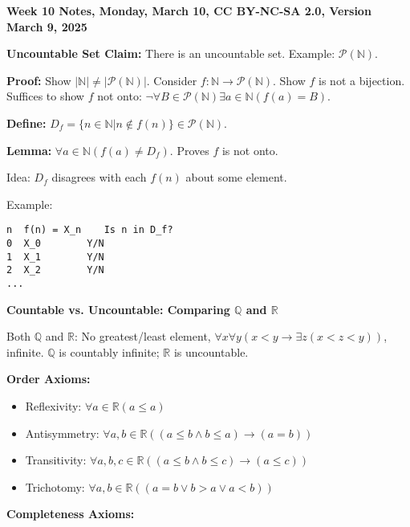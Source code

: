 \documentclass{article}
\begin{document}
\fontsize{6pt}{7pt}\selectfont %

\begin{multicols}{3}

\noindent\textbf{Week 10 Notes, Monday, March 10, CC BY-NC-SA 2.0, Version March 9, 2025}

\noindent\textbf{Uncountable Set Claim:} There is an uncountable set. Example: $\mathcal{P}(\mathbb{N})$.

\noindent\textbf{Proof:} Show $|\mathbb{N}| \neq |\mathcal{P}(\mathbb{N})|$.  Consider $f:\mathbb{N} \to \mathcal{P}(\mathbb{N})$. Show $f$ is not a bijection.  Suffices to show $f$ not onto: $\neg \forall B \in \mathcal{P}(\mathbb{N}) \exists a \in \mathbb{N} (f(a) = B)$.

\noindent\textbf{Define:} $D_f = \{n \in \mathbb{N} | n \notin f(n)\} \in \mathcal{P}(\mathbb{N})$.

\noindent\textbf{Lemma:} $\forall a \in \mathbb{N} (f(a) \neq D_f)$.  Proves $f$ is not onto.

\noindent Idea: $D_f$ disagrees with each $f(n)$ about some element.

\noindent Example:
\begin{verbatim}
n  f(n) = X_n    Is n in D_f?
0  X_0        Y/N
1  X_1        Y/N
2  X_2        Y/N
...
\end{verbatim}

\noindent\textbf{Countable vs. Uncountable: Comparing $\mathbb{Q}$ and $\mathbb{R}$}

\noindent Both $\mathbb{Q}$ and $\mathbb{R}$: No greatest/least element, $\forall x \forall y (x<y \to \exists z (x<z<y))$, infinite.  $\mathbb{Q}$ is countably infinite; $\mathbb{R}$ is uncountable.

\noindent\textbf{Order Axioms:}

\begin{itemize}[nosep, topsep=0pt, itemsep=0pt, leftmargin=10pt]
    \item Reflexivity: $\forall a \in \mathbb{R} (a \leq a)$
    \item Antisymmetry: $\forall a,b \in \mathbb{R} ((a \leq b \land b \leq a) \to (a = b))$
    \item Transitivity: $\forall a,b,c \in \mathbb{R} ((a \leq b \land b \leq c) \to (a \leq c))$
    \item Trichotomy: $\forall a,b \in \mathbb{R} ((a=b \lor b>a \lor a<b))$
\end{itemize}

\noindent\textbf{Completeness Axioms:}


\end{multicols}
\end{document}
